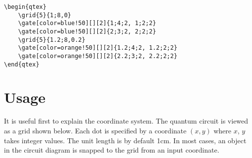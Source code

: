 \documentclass[aps,prl,showpacs,notitlepage,floatfix,superscriptaddress,nofootinbib]{revtex4-2}
\begin{document}
\begin{Code}
\begin{center}
\begin{qtex}
\end{qtex}
\end{center}
\tcblower
\begin{lstlisting}
\begin{qtex}
    \grid{5}{1;8,0}
    \gate[color=blue!50][][2]{1;4;2, 1;2;2}
    \gate[color=blue!50][][2]{2;3;2, 2;2;2}
    \grid{5}{1.2;8,0.2}
    \gate[color=orange!50][][2]{1.2;4;2, 1.2;2;2}
    \gate[color=orange!50][][2]{2.2;3;2, 2.2;2;2}
\end{qtex}
\end{lstlisting}
\end{Code}

\section{Usage}

It is useful first to explain the coordinate system. The quantum circuit is viewed as a grid shown below. Each dot is specified by a coordinate $(x, y)$ where $x$, $y$ takes integer values. The unit length is by default 1cm. In most cases, an object in the circuit diagram is snapped to the grid from an input coordinate. 
\end{document}
